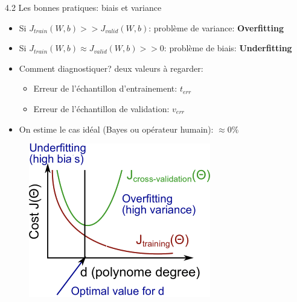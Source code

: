 \begin{frame}{4.2 Les bonnes pratiques: biais et variance}
  \begin{itemize}
  \item Si $J_{train}(W,b) >> J_{valid}(W,b)$: problème de variance: \textbf{Overfitting}
  \item Si $J_{train}(W,b) \approx J_{valid}(W,b) >> 0$: problème de biais: \textbf{Underfitting}
  \item Comment diagnostiquer? deux valeurs à regarder:
    \begin{itemize}
      \normalsize
    \item Erreur de l'échantillon d'entrainement: $t_{err}$
    \item Erreur de l'échantillon de validation: $v_{err}$
    \end{itemize}
  \item On estime le cas idéal (Bayes ou opérateur humain): $\approx 0\%$
  \end{itemize}
  \vspace{0.5cm}
  \begin{minipage}{.39\textwidth}
    \begin{figure}
      \includegraphics[trim={0 54 0 0},clip,width=\textwidth]{fig/biasVsVariance}
    \end{figure}
    \vspace{-1cm}
    \begin{center}
      \scriptsize
      \href{https://www.coursera.org/learn/machine-learning}{\color{blue}{[Coursera]}}

\end{center}
\end{minipage}
\end{frame}

